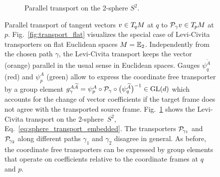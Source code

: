\begin{figure}
\begin{subfigure}[b]{0.4\textwidth}
        \vspace*{-2ex}
        \caption{\small
            Parallel transport on the 2-sphere $S^2$.
        }
        \label{fig:transport_sphere}
    \end{subfigure}
    \caption{\small
        Parallel transport of tangent vectors $v\in T_{\mkern-1.5mu q}\mkern-.5muM$ at $q$ to $\mathcal{P}_\gamma v \in T_{\mkern-1.5mu p}\mkern-.5muM$ at $p$.
        Fig.~\ref{fig:transport_flat} visualizes the special case of Levi-Civita transporters on flat Euclidean spaces $M = \mathbb{E}_2$.
        Independently from the chosen path $\gamma$, the Levi-Civita transport keeps the vector (orange) parallel in the usual sense in Euclidean spaces.
        Gauges $\psi_q^{\widetilde{A}}$ (red) and $\psi_p^A$ (green) allow to express the coordinate free transporter by a group element
        $g_\gamma^{A\widetilde{A}} = \psi_p^A \circ \mathcal{P}_\gamma \circ \big(\psi_q^{\widetilde{A}}\big)^{-1} \in \operatorname{GL}(d)$
        which accounts for the change of vector coefficients if the target frame does not agree with the transported source frame.
        Fig.~\ref{fig:transport_sphere} shows the Levi-Civita transport on the 2-sphere~$S^2$, Eq.~\eqref{eq:sphere_transport_embedded}.
        The transporters $\mathcal{P}_{\mkern-2mu\gamma_1}$ and $\mathcal{P}_{\mkern-2mu\gamma_2}$ along different paths $\gamma_1$ and $\gamma_2$ disagree in general.
        As before, the coordinate free transporters can be expressed by group elements that operate on coefficients relative to the coordinate frames at $q$ and $p$.
     }
    \label{fig:transport}
\end{figure}


